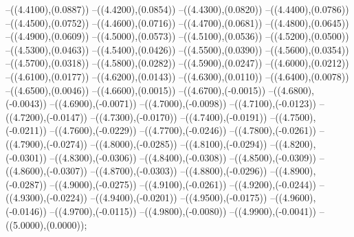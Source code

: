 {	--({\sx*(4.4100)},{\sy*(0.0887)})
	--({\sx*(4.4200)},{\sy*(0.0854)})
	--({\sx*(4.4300)},{\sy*(0.0820)})
	--({\sx*(4.4400)},{\sy*(0.0786)})
	--({\sx*(4.4500)},{\sy*(0.0752)})
	--({\sx*(4.4600)},{\sy*(0.0716)})
	--({\sx*(4.4700)},{\sy*(0.0681)})
	--({\sx*(4.4800)},{\sy*(0.0645)})
	--({\sx*(4.4900)},{\sy*(0.0609)})
	--({\sx*(4.5000)},{\sy*(0.0573)})
	--({\sx*(4.5100)},{\sy*(0.0536)})
	--({\sx*(4.5200)},{\sy*(0.0500)})
	--({\sx*(4.5300)},{\sy*(0.0463)})
	--({\sx*(4.5400)},{\sy*(0.0426)})
	--({\sx*(4.5500)},{\sy*(0.0390)})
	--({\sx*(4.5600)},{\sy*(0.0354)})
	--({\sx*(4.5700)},{\sy*(0.0318)})
	--({\sx*(4.5800)},{\sy*(0.0282)})
	--({\sx*(4.5900)},{\sy*(0.0247)})
	--({\sx*(4.6000)},{\sy*(0.0212)})
	--({\sx*(4.6100)},{\sy*(0.0177)})
	--({\sx*(4.6200)},{\sy*(0.0143)})
	--({\sx*(4.6300)},{\sy*(0.0110)})
	--({\sx*(4.6400)},{\sy*(0.0078)})
	--({\sx*(4.6500)},{\sy*(0.0046)})
	--({\sx*(4.6600)},{\sy*(0.0015)})
	--({\sx*(4.6700)},{\sy*(-0.0015)})
	--({\sx*(4.6800)},{\sy*(-0.0043)})
	--({\sx*(4.6900)},{\sy*(-0.0071)})
	--({\sx*(4.7000)},{\sy*(-0.0098)})
	--({\sx*(4.7100)},{\sy*(-0.0123)})
	--({\sx*(4.7200)},{\sy*(-0.0147)})
	--({\sx*(4.7300)},{\sy*(-0.0170)})
	--({\sx*(4.7400)},{\sy*(-0.0191)})
	--({\sx*(4.7500)},{\sy*(-0.0211)})
	--({\sx*(4.7600)},{\sy*(-0.0229)})
	--({\sx*(4.7700)},{\sy*(-0.0246)})
	--({\sx*(4.7800)},{\sy*(-0.0261)})
	--({\sx*(4.7900)},{\sy*(-0.0274)})
	--({\sx*(4.8000)},{\sy*(-0.0285)})
	--({\sx*(4.8100)},{\sy*(-0.0294)})
	--({\sx*(4.8200)},{\sy*(-0.0301)})
	--({\sx*(4.8300)},{\sy*(-0.0306)})
	--({\sx*(4.8400)},{\sy*(-0.0308)})
	--({\sx*(4.8500)},{\sy*(-0.0309)})
	--({\sx*(4.8600)},{\sy*(-0.0307)})
	--({\sx*(4.8700)},{\sy*(-0.0303)})
	--({\sx*(4.8800)},{\sy*(-0.0296)})
	--({\sx*(4.8900)},{\sy*(-0.0287)})
	--({\sx*(4.9000)},{\sy*(-0.0275)})
	--({\sx*(4.9100)},{\sy*(-0.0261)})
	--({\sx*(4.9200)},{\sy*(-0.0244)})
	--({\sx*(4.9300)},{\sy*(-0.0224)})
	--({\sx*(4.9400)},{\sy*(-0.0201)})
	--({\sx*(4.9500)},{\sy*(-0.0175)})
	--({\sx*(4.9600)},{\sy*(-0.0146)})
	--({\sx*(4.9700)},{\sy*(-0.0115)})
	--({\sx*(4.9800)},{\sy*(-0.0080)})
	--({\sx*(4.9900)},{\sy*(-0.0041)})
	--({\sx*(5.0000)},{\sy*(0.0000)});
}
